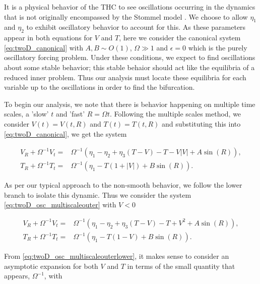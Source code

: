 It is a physical behavior of the THC to see oscillations occurring in the dynamics that is not originally encompassed by the Stommel model \cite{alley2003abrupt,huybers2005obliquity,marotzke2000abrupt,rahmstorf2000thermohaline,rahmstorf2002ocean,stastna2007box}. We choose to allow $\eta_1$ and $\eta_2$ to exhibit oscillatory behavior to account for this. As these parameters appear in both equations for $V$ and $T$, here we consider the canonical system \eqref{eq:twoD_canonical} with $A,B\sim O(1)$, $\Omega\gg 1$ and $\epsilon=0$ which is the purely oscillatory forcing problem. Under these conditions, we expect to find oscillations about some stable behavior; this stable behaior should act like the equilibria of a reduced inner problem. Thus our analysis must locate these equilibria for each variable up to the oscillations in order to find the bifurcation.

To begin our analysis, we note that there is behavior happening on multiple time scales, a 'slow' $t$ and 'fast' $R = \Omega t$. Following the multiple scales method, we consider $V(t)=V(t,R)$ and $T(t)=T(t,R)$ and substituting this into \eqref{eq:twoD_canonical}, we get the system

\begin{equation}\label{eq:twoD_osc_multiscaleouter}
\begin{aligned}
V_R+\Omega^{-1}V_t = & \Omega^{-1}\left(\eta_1-\eta_2+\eta_3(T-V)-T-V|V|+A\sin(R)\right),\\
T_R+\Omega^{-1}T_t = & \Omega^{-1}\left(\eta_1-T(1+|V|)+B\sin(R)\right).
\end{aligned}
\end{equation}

As per our typical approach to the non-smooth behavior, we follow the lower branch to isolate this dynamic. Thus we consider the system \eqref{eq:twoD_osc_multiscaleouter} with $V<0$

\begin{equation}\label{eq:twoD_osc_multiscaleouterlower}
\begin{aligned}
V_R+\Omega^{-1}V_t = & \Omega^{-1}\left(\eta_1-\eta_2+\eta_3(T-V)-T+V^2+A\sin(R)\right),\\
T_R+\Omega^{-1}T_t = & \Omega^{-1}\left(\eta_1-T(1-V)+B\sin(R)\right).
\end{aligned}
\end{equation}

From \eqref{eq:twoD_osc_multiscaleouterlower}, it makes sense to consider an asymptotic expansion for both $V$ and $T$ in terms of the small quantity that appears, $\Omega^{-1}$, with

